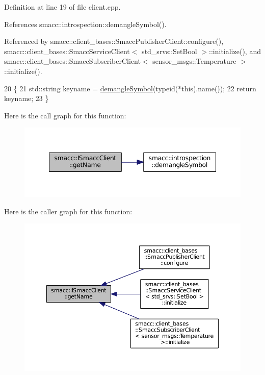 Definition at line 19 of file client.\+cpp.



References smacc\+::introspection\+::demangle\+Symbol().



Referenced by smacc\+::client\+\_\+bases\+::\+Smacc\+Publisher\+Client\+::configure(), smacc\+::client\+\_\+bases\+::\+Smacc\+Service\+Client$<$ std\+\_\+srvs\+::\+Set\+Bool $>$\+::initialize(), and smacc\+::client\+\_\+bases\+::\+Smacc\+Subscriber\+Client$<$ sensor\+\_\+msgs\+::\+Temperature $>$\+::initialize().


\begin{DoxyCode}
20 \{
21     std::string keyname = \hyperlink{namespacesmacc_1_1introspection_a2f495108db3e57604d8d3ff5ef030302}{demangleSymbol}(\textcolor{keyword}{typeid}(*this).name());
22     \textcolor{keywordflow}{return} keyname;
23 \}
\end{DoxyCode}


Here is the call graph for this function\+:
\nopagebreak
\begin{figure}[H]
\begin{center}
\leavevmode
\includegraphics[width=348pt]{classsmacc_1_1ISmaccClient_a20846aabfd1de832aa27d7a8237a1742_cgraph}
\end{center}
\end{figure}




Here is the caller graph for this function\+:
\nopagebreak
\begin{figure}[H]
\begin{center}
\leavevmode
\includegraphics[width=350pt]{classsmacc_1_1ISmaccClient_a20846aabfd1de832aa27d7a8237a1742_icgraph}
\end{center}
\end{figure}


